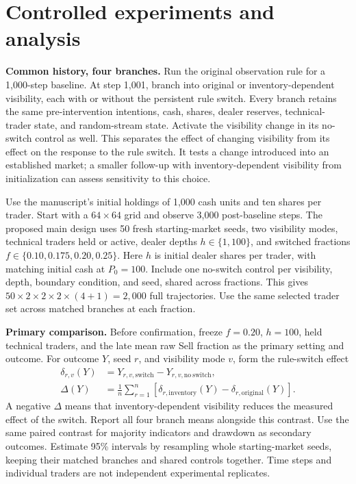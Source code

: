\documentclass[11pt,letterpaper]{article}
\newcommand{\lead}[1]{\textbf{\textcolor{ink}{#1}}}
\begin{document}
\newpage
\section{Controlled experiments and analysis}
\lead{Common history, four branches.} Run the original observation rule for a 1,000-step baseline. At step 1,001, branch into original or inventory-dependent visibility, each with or without the persistent rule switch. Every branch retains the same pre-intervention intentions, cash, shares, dealer reserves, technical-trader state, and random-stream state. Activate the visibility change in its no-switch control as well. This separates the effect of changing visibility from its effect on the response to the rule switch. It tests a change introduced into an established market; a smaller follow-up with inventory-dependent visibility from initialization can assess sensitivity to this choice.

Use the manuscript's initial holdings of 1,000 cash units and ten shares per trader. Start with a $64\times64$ grid and observe 3,000 post-baseline steps. The proposed main design uses 50 fresh starting-market seeds, two visibility modes, technical traders held or active, dealer depths $h\in\{1,100\}$, and switched fractions $f\in\{0.10,0.175,0.20,0.25\}$. Here $h$ is initial dealer shares per trader, with matching initial cash at $P_0=100$. Include one no-switch control per visibility, depth, boundary condition, and seed, shared across fractions. This gives $50\times2\times2\times2\times(4+1)=2{,}000$ full trajectories. Use the same selected trader set across matched branches at each fraction.

\lead{Primary comparison.} Before confirmation, freeze $f=0.20$, $h=100$, held technical traders, and the late mean raw Sell fraction as the primary setting and outcome. For outcome $Y$, seed $r$, and visibility mode $v$, form the rule-switch effect
\begin{align}
 \delta_{r,v}(Y)&=Y_{r,v,\mathrm{switch}}-Y_{r,v,\mathrm{no\ switch}},\\
 \Delta(Y)&=\frac{1}{n}\sum_{r=1}^{n}
       [\delta_{r,\mathrm{inventory}}(Y)-\delta_{r,\mathrm{original}}(Y)].
\end{align}
A negative $\Delta$ means that inventory-dependent visibility reduces the measured effect of the switch. Report all four branch means alongside this contrast. Use the same paired contrast for majority indicators and drawdown as secondary outcomes. Estimate 95\% intervals by resampling whole starting-market seeds, keeping their matched branches and shared controls together. Time steps and individual traders are not independent experimental replicates.
\end{document}
